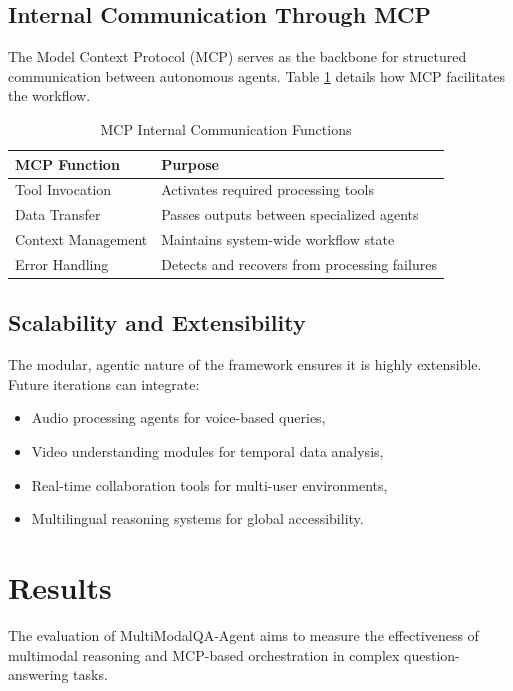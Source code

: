 \documentclass[conference]{IEEEtran}
\begin{document}
\subsection{Internal Communication Through MCP}
The Model Context Protocol (MCP) serves as the backbone for structured communication between autonomous agents. Table \ref{tab:mcp_functions} details how MCP facilitates the workflow.

\begin{table}[htbp]
\centering
\caption{MCP Internal Communication Functions}
\label{tab:mcp_functions}
\begin{tabular}{|l|l|}
\hline
\textbf{MCP Function} & \textbf{Purpose} \\ \hline
Tool Invocation & Activates required processing tools \\ \hline
Data Transfer & Passes outputs between specialized agents \\ \hline
Context Management & Maintains system-wide workflow state \\ \hline
Error Handling & Detects and recovers from processing failures \\ \hline
\end{tabular}
\end{table}

\subsection{Scalability and Extensibility}
The modular, agentic nature of the framework ensures it is highly extensible. Future iterations can integrate:
\begin{itemize}
    \item Audio processing agents for voice-based queries,
    \item Video understanding modules for temporal data analysis,
    \item Real-time collaboration tools for multi-user environments,
    \item Multilingual reasoning systems for global accessibility.
\end{itemize}

\section{Results}
The evaluation of MultiModalQA-Agent aims to measure the effectiveness of multimodal reasoning and MCP-based orchestration in complex question-answering tasks.
\end{document}
